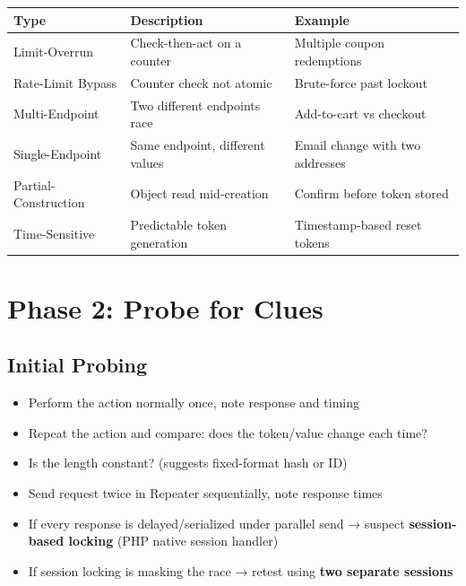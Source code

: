 \documentclass[11pt]{article}
\begin{document}
\begin{center}
\begin{tabular}{|l|l|l|}
\hline
\textbf{Type} & \textbf{Description} & \textbf{Example} \\
\hline
Limit-Overrun & Check-then-act on a counter & Multiple coupon redemptions \\
Rate-Limit Bypass & Counter check not atomic & Brute-force past lockout \\
Multi-Endpoint & Two different endpoints race & Add-to-cart vs checkout \\
Single-Endpoint & Same endpoint, different values & Email change with two addresses \\
Partial-Construction & Object read mid-creation & Confirm before token stored \\
Time-Sensitive & Predictable token generation & Timestamp-based reset tokens \\
\hline
\end{tabular}
\end{center}

\section{Phase 2: Probe for Clues}

\subsection{Initial Probing}

\begin{checklistbox}
\begin{itemize}
    \item[\checkmark] Perform the action normally once, note response and timing
    \item[\checkmark] Repeat the action and compare: does the token/value change each time?
    \item[\checkmark] Is the length constant? (suggests fixed-format hash or ID)
    \item[\checkmark] Send request twice in Repeater sequentially, note response times
    \item[\checkmark] If every response is delayed/serialized under parallel send → suspect \textbf{session-based locking} (PHP native session handler)
    \item[\checkmark] If session locking is masking the race → retest using \textbf{two separate sessions}
\end{itemize}
\end{checklistbox}
\end{document}
